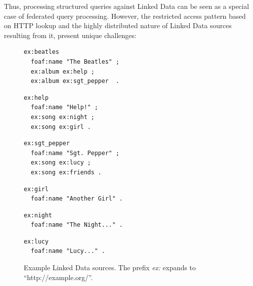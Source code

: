 Thus, processing structured queries against Linked Data can be seen as
a special case of federated query processing. However, the restricted
access pattern based on HTTP lookup and the highly distributed nature
of Linked Data sources resulting from it, present unique challenges:

\begin{figure}[ht]
  \centering
  \begin{minipage}{0.32\linewidth}
\begin{lstlisting}[breaklines=true,language=ttl,linewidth=0.98\linewidth,frame=single,caption=http://example.org/beatles]
ex:beatles 
  foaf:name "The Beatles" ;
  ex:album ex:help ;
  ex:album ex:sgt_pepper  .
\end{lstlisting}
  \end{minipage}
  \begin{minipage}{0.32\linewidth}
\begin{lstlisting}[breaklines=true,language=ttl,linewidth=0.98\linewidth,frame=single,caption=http://example.org/help]
ex:help 
  foaf:name "Help!" ;
  ex:song ex:night ;
  ex:song ex:girl .
\end{lstlisting}
  \end{minipage}
  \begin{minipage}{0.32\linewidth}
\begin{lstlisting}[breaklines=true,language=ttl,linewidth=0.98\linewidth,frame=single,caption=http://example.org/sgt\_pepper]
ex:sgt_pepper
  foaf:name "Sgt. Pepper" ;
  ex:song ex:lucy ;
  ex:song ex:friends .
\end{lstlisting}
  \end{minipage}
  \begin{minipage}{0.32\linewidth}
\begin{lstlisting}[breaklines=false,language=ttl,frame=single,linewidth=0.98\linewidth,caption=http://example.org/girl]
ex:girl
  foaf:name "Another Girl" .

\end{lstlisting}
  \label{fig:example}
  \end{minipage}
  \begin{minipage}{0.32\linewidth}
\begin{lstlisting}[breaklines=true,language=ttl,frame=single,linewidth=0.98\linewidth,showlines=true,caption=http://example.org/night]
ex:night 
  foaf:name "The Night..." .
\end{lstlisting}
  \end{minipage}
  \begin{minipage}{0.32\linewidth}
\begin{lstlisting}[breaklines=true,language=ttl,frame=single,showlines=true,caption=http://example.org/lucy]
ex:lucy
  foaf:name "Lucy..." .
\end{lstlisting}
  \end{minipage}

  \caption{Example Linked Data sources. The prefix \emph{ex:} expands
    to ``http://example.org/''.}
  \label{fig:sources}
\end{figure}

